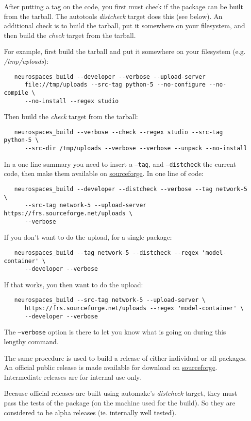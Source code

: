 \documentclass[12pt]{article}
\begin{document}
After putting a tag on the code, you first must check if the package
can be built from the tarball. The autotools {\it distcheck} target
does this (see below). An additional check is to build the tarball,
put it somewhere on your filesystem, and then build the {\it check}
target from the tarball.

For example, first build the tarball and put it somewhere on your filesystem (e.g. {\it /tmp/uploads}):
\begin{verbatim}
   neurospaces_build --developer --verbose --upload-server 
      file://tmp/uploads --src-tag python-5 --no-configure --no-compile \
      --no-install --regex studio
\end{verbatim}
Then build the {\it check} target from the tarball:
\begin{verbatim}
   neurospaces_build --verbose --check --regex studio --src-tag python-5 \
      --src-dir /tmp/uploads --verbose --verbose --unpack --no-install
\end{verbatim}

In a one line summary you need to insert a {\tt --tag}, and {\tt --distcheck} the current code, then make them available on \href{http://sourceforge.net/projects/neurospaces/}{sourceforge}. In one line of code:
\begin{verbatim}
   neurospaces_build --developer --distcheck --verbose --tag network-5 \
      --src-tag network-5 --upload-server https://frs.sourceforge.net/uploads \
      --verbose
\end{verbatim}
If you don't want to do the upload, for a single package:
\begin{verbatim}
   neurospaces_build --tag network-5 --distcheck --regex 'model-container' \
      --developer --verbose
\end{verbatim}
If that works, you then want to do the upload:
\begin{verbatim}
   neurospaces_build --src-tag network-5 --upload-server \
      https://frs.sourceforge.net/uploads --regex 'model-container' \
      --developer --verbose
\end{verbatim}
The {\tt --verbose} option is there to let you know what is going on during this lengthy command.

The same procedure is used to build a release of either individual or all packages. An official public release is made available for download on \href{http://sourceforge.net/projects/neurospaces/}{sourceforge}. Intermediate releases are for internal use only.

Because official releases are built using automake's {\it distcheck} target, they must pass the tests of the package (on the machine used for the build). So they are considered to be alpha releases (ie. internally well tested).
\end{document}
